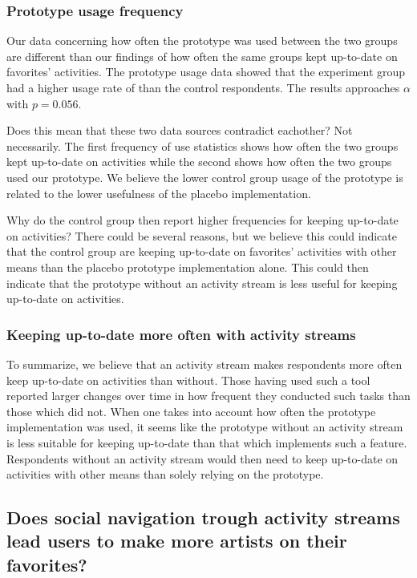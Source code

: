 \subsubsection{Prototype usage frequency}

Our data concerning how often the prototype was used between the two groups%
are different than our findings of how often the same groups kept up-to-date
on favorites' activities. The prototype usage data showed that the experiment
group had a higher usage rate of \latest{} than the control respondents. The
results approaches $\alpha$ with $p = 0.056$.

Does this mean that these two data sources contradict eachother? Not
necessarily. The first frequency of use statistics shows how often the two
groups kept up-to-date on activities while the second shows how often
the two groups used our prototype. We believe the lower control group usage of
the prototype is related to the lower usefulness of the placebo
implementation.

Why do the control group then report higher frequencies for keeping up-to-date
on activities? There could be several reasons, but we believe this could
indicate that the control group are keeping up-to-date on favorites'
activities with other means than the placebo prototype implementation alone.
This could then indicate that the prototype without an activity stream is less
useful for keeping up-to-date on activities.

\subsubsection{Keeping up-to-date more often with activity streams}

To summarize, we believe that an activity stream makes respondents
more often keep up-to-date on activities than without. Those having used such
a tool reported larger changes over time in how frequent they conducted such
tasks than those which did not. When one takes into account how often the
prototype implementation was used, it seems like the prototype without
an activity stream is less suitable for keeping up-to-date than that which
implements such a feature. Respondents without an activity stream would
then need to keep up-to-date on activities with other means than solely
relying on the prototype.

\subsection{%
  Does social navigation trough activity streams lead users to make
  more artists on \urort{} their favorites?
}

